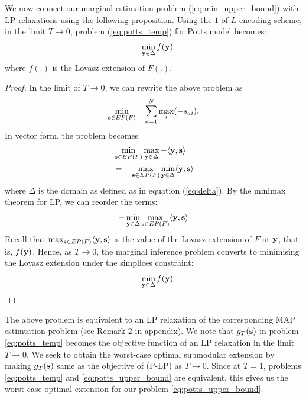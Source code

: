 We now connect our marginal estimation problem (\ref{eq:min_upper_bound}) with
LP relaxations using the following proposition.
{\proposition Using the $1$-of-$L$ encoding scheme, in the limit $T \to 0$,
  problem (\ref{eq:potts_temp}) for Potts model becomes:
\begin{align}
    - \min_{{\bf y} \in \Delta} f({\bf y}) 
\end{align}
where $f(.)$ is the Lovasz extension of $F(.)$.
\label{proposition:potts_equiv}}

\begin{proof}
In the limit of $T \to 0$, we can rewrite the above problem as
\begin{equation}
    \min_{{\bf s} \in EP(F)} \quad \sum_{a = 1}^{N} \max_{i} (-s_{ai}).
\end{equation}
In vector form, the problem becomes
\begin{align}
    &\min_{{\bf s} \in EP(F)} \max_{{\bf y} \in \Delta} - \langle {\bf y}, {\bf s} \rangle \\
    & = - \max_{{\bf s} \in EP(F)} \min_{{\bf y} \in \Delta} \langle {\bf y}, {\bf s} \rangle
    \label{eq:maxmin}
\end{align}
where $\Delta$ is the domain as defined as in equation (\ref{eq:delta}). By the minimax theorem for LP, we can reorder the terms:
\begin{equation}
    - \min_{{\bf y} \in \Delta} \max_{{\bf s} \in EP(F)} \langle {\bf y}, {\bf s} \rangle 
    \label{eq:minmax}
\end{equation}
Recall that $\max_{{\bf s} \in EP(F)} \langle {\bf y}, {\bf s} \rangle$ is the value of the Lovasz extension of $F$ at $\bf y$, that is, $f({\bf y})$. Hence, as $T \to 0$, the marginal inference problem converts to minimising the Lovasz extension under the simplices constraint:
\begin{equation}
    - \min_{{\bf y} \in \Delta} f({\bf y}) 
    \label{eq:minLovasz}
\end{equation}
\end{proof}

The above problem is equivalent to an LP relaxation of the corresponding MAP estimtation problem (see Remark 2 in appendix). We note that $g_T ({\bf s})$ in problem \eqref{eq:potts_temp} becomes the objective function of an LP relaxation in the limit $T \to 0$. We seek to obtain the worst-case optimal submodular extension by making $g_T ({\bf s})$ same as the objective of (P-LP) as $T \to 0$. Since at $T = 1$, problems \eqref{eq:potts_temp} and \eqref{eq:potts_upper_bound} are equivalent, this gives us the worst-case optimal extension for our problem \eqref{eq:potts_upper_bound}. 


